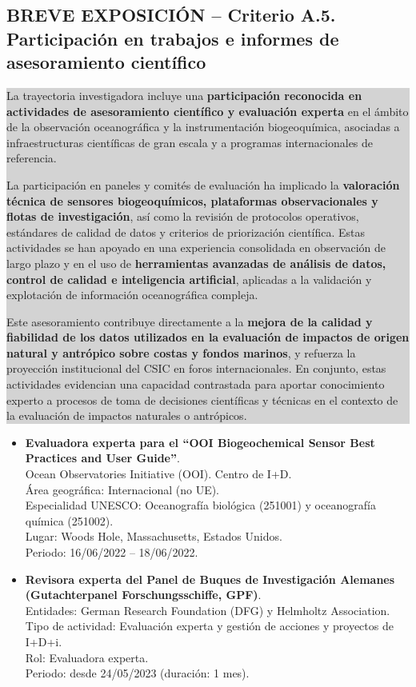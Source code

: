 \documentclass[11pt,a4paper]{article}
\newcommand{\breveexposicion}[2]{
    \subsection*{\color{darkgray}\textbf{BREVE EXPOSICIÓN -- #1}}
    \vspace{0.3em}
    \noindent\colorbox{lightgray}{%
        \begin{minipage}{0.97\textwidth}
        \vspace{0.5em}
        \color{darkgray}
        #2
        \vspace{0.5em}
        \end{minipage}
    }
    \vspace{1em}
}
\begin{document}
\breveexposicion{Criterio A.5. Participación en trabajos e informes de asesoramiento científico}{
La trayectoria investigadora incluye una \textbf{participación reconocida en actividades de asesoramiento científico y evaluación experta} en el ámbito de la observación oceanográfica y la instrumentación biogeoquímica, asociadas a infraestructuras científicas de gran escala y a programas internacionales de referencia.

La participación en paneles y comités de evaluación ha implicado la \textbf{valoración técnica de sensores biogeoquímicos, plataformas observacionales y flotas de investigación}, así como la revisión de protocolos operativos, estándares de calidad de datos y criterios de priorización científica. Estas actividades se han apoyado en una experiencia consolidada en observación de largo plazo y en el uso de \textbf{herramientas avanzadas de análisis de datos, control de calidad e inteligencia artificial}, aplicadas a la validación y explotación de información oceanográfica compleja.

Este asesoramiento contribuye directamente a la \textbf{mejora de la calidad y fiabilidad de los datos utilizados en la evaluación de impactos de origen natural y antrópico sobre costas y fondos marinos}, y refuerza la proyección institucional del CSIC en foros internacionales. En conjunto, estas actividades evidencian una capacidad contrastada para aportar conocimiento experto a procesos de toma de decisiones científicas y técnicas en el contexto de la evaluación de impactos naturales o antrópicos.
}

\begin{itemize}[leftmargin=*]

    \item \textbf{Evaluadora experta para el “OOI Biogeochemical Sensor Best Practices and User Guide”}.\\
    Ocean Observatories Initiative (OOI). Centro de I+D.\\
    Área geográfica: Internacional (no UE).\\
    Especialidad UNESCO: Oceanografía biológica (251001) y oceanografía química (251002).\\
    Lugar: Woods Hole, Massachusetts, Estados Unidos.\\
    Periodo: 16/06/2022 -- 18/06/2022.

    \item \textbf{Revisora experta del Panel de Buques de Investigación Alemanes (Gutachterpanel Forschungsschiffe, GPF)}.\\
    Entidades: German Research Foundation (DFG) y Helmholtz Association.\\
    Tipo de actividad: Evaluación experta y gestión de acciones y proyectos de I+D+i.\\
    Rol: Evaluadora experta.\\
    Periodo: desde 24/05/2023 (duración: 1 mes).

\end{itemize}
\newpage
\end{document}

